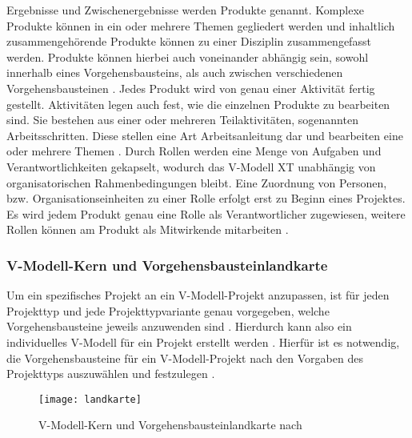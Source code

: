 Ergebnisse und Zwischenergebnisse werden Produkte genannt. Komplexe Produkte können in ein oder mehrere Themen gegliedert werden und inhaltlich zusammengehörende Produkte können zu einer Disziplin zusammengefasst werden. Produkte können hierbei auch voneinander abhängig sein, sowohl innerhalb eines Vorgehensbausteins, als auch zwischen verschiedenen Vorgehensbausteinen \cite{2004vmodell}.\newline
Jedes Produkt wird von genau einer Aktivität fertig gestellt. Aktivitäten legen auch fest, wie die einzelnen Produkte zu bearbeiten sind. Sie bestehen aus einer oder mehreren Teilaktivitäten, sogenannten Arbeitsschritten. Diese stellen eine Art Arbeitsanleitung dar und bearbeiten eine oder mehrere Themen \cite{2004vmodell}.\newline
Durch Rollen werden eine Menge von Aufgaben und Verantwortlichkeiten gekapselt, wodurch das V-Modell XT unabhängig von organisatorischen Rahmenbedingungen bleibt. Eine Zuordnung von Personen, bzw. Organisationseinheiten zu einer Rolle erfolgt erst zu Beginn eines Projektes. Es wird jedem Produkt genau eine Rolle als Verantwortlicher zugewiesen, weitere Rollen können am Produkt als Mitwirkende mitarbeiten \cite{2004vmodell}. \newline



\subsubsection{V-Modell-Kern und Vorgehensbausteinlandkarte}

Um ein spezifisches Projekt an ein V-Modell-Projekt anzupassen, ist für jeden Projekttyp und jede Projekttypvariante genau vorgegeben, welche Vorgehensbausteine jeweils anzuwenden sind \cite{2004vmodell}. Hierdurch kann also ein individuelles V-Modell für ein Projekt erstellt werden \cite{heinrich2007}. Hierfür ist es notwendig, die Vorgehensbausteine für ein V-Modell-Projekt nach den Vorgaben des Projekttyps auszuwählen und festzulegen \cite{2004vmodell}. \newline

\begin{figure}[htp]
\begin{center}
  \texttt{[image: landkarte]} %
  \caption{V-Modell-Kern und Vorgehensbausteinlandkarte nach \cite{2004vmodell}}
  \label{fig:landkarte}
\end{center}
\end{figure}

